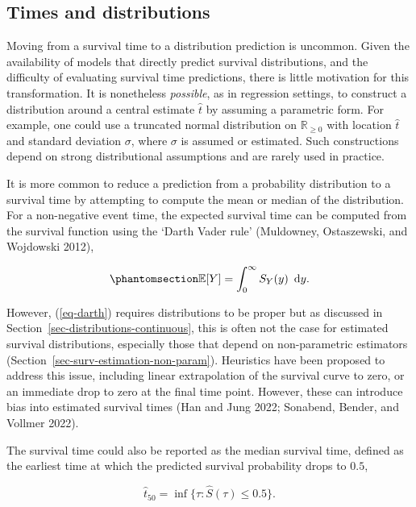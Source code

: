 \documentclass[
  letterpaper,
  krantz2]{style/krantz}
\begin{document}
\subsection{Times and distributions}\label{times-and-distributions}

Moving from a survival time to a distribution
prediction is uncommon. Given the
availability of models that directly predict survival distributions, and
the difficulty of evaluating survival time predictions, there is little
motivation for this transformation. It is nonetheless \emph{possible},
as in regression settings, to construct a distribution around a central
estimate \(\hat{t}\) by assuming a parametric form. For example, one
could use a truncated normal distribution on \(\mathbb{R}_{\geq 0}\)
with location \(\hat{t}\) and standard deviation \(\sigma\), where
\(\sigma\) is assumed or estimated. Such constructions depend on strong
distributional assumptions and are rarely used in practice.

It is more common to reduce a prediction from a probability distribution
to a survival time by attempting to compute the mean or median of the
distribution. For a non-negative event time, the expected survival time
can be computed from the survival function using the `Darth Vader
rule' (Muldowney, Ostaszewski, and Wojdowski
2012),

\begin{equation}\phantomsection\label{eq-darth}{
\mathbb{E}[Y] = \int^\infty_0 S_Y(y) \ \,\mathrm{d}y.
}\end{equation}

However, (\ref{eq-darth}) requires distributions to be
proper but as discussed in
Section~\ref{sec-distributions-continuous}, this is often not the case
for estimated survival distributions, especially those that depend on
non-parametric estimators (Section~\ref{sec-surv-estimation-non-param}).
Heuristics have been proposed to address this issue, including linear
extrapolation of the survival curve to zero, or an immediate drop to
zero at the final time point. However, these can introduce bias into
estimated survival times (Han and Jung 2022; Sonabend, Bender, and
Vollmer 2022).

The survival time could also be reported as the median survival
time, defined as the earliest time at which
the predicted survival probability drops to \(0.5\),

\[
\hat{t}_{50} = \inf\{\tau: \hat{S}(\tau) \leq 0.5 \}.
\]
\end{document}
